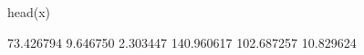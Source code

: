\begin{Schunk}
\begin{Sinput}
  head(x)
\end{Sinput}
\begin{Soutput}
[1]  73.426794   9.646750   2.303447 140.960617 102.687257  10.829624
\end{Soutput}
\end{Schunk}
